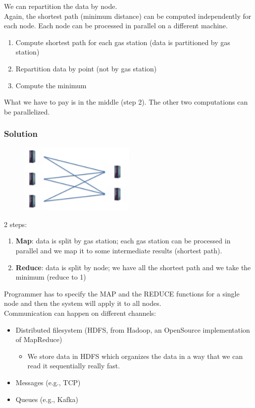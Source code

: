 \documentclass[10pt,a4paper]{article}
\begin{document}
We can repartition the data by node. \\ Again, the shortest path (minimum distance) can be computed independently for each node. Each node can be processed in parallel on a different machine. 
\begin{enumerate}
	\item Compute shortest path for each gas station (data is partitioned by gas station)
	\item Repartition data by point (not by gas station)
	\item Compute the minimum
\end{enumerate}
What we have to pay is in the middle (step 2). The other two computations can be parallelized.
\subsubsection{Solution}
\begin{figure}[h!]
\hfill \includegraphics[width=160pt]{images/map-reduce.png}\hspace*{\fill}
  \label{fig:map-reduce}
\end{figure} 
2 steps:
\begin{enumerate}
	\item \textbf{Map}: data is split by gas station; each gas station can be processed in parallel and we map it to some intermediate results (shortest path).
	\item \textbf{Reduce}: data is split by node; we have all the shortest path and we take the minimum (reduce to 1)
\end{enumerate}
Programmer has to specify the MAP and the REDUCE functions for a single node and then the system will apply it to all nodes. \pagebreak \\
Communication can happen on different channels:
\begin{itemize}
	\item Distributed filesystem (HDFS, from Hadoop, an OpenSource implementation of MapReduce)
	\begin{itemize}
		\item We store data in HDFS which organizes the data in a way that we can read it sequentially really fast.
	\end{itemize}
	\item Messages (e.g., TCP)
	\item Queues (e.g., Kafka)
\end{itemize}
\end{document}
